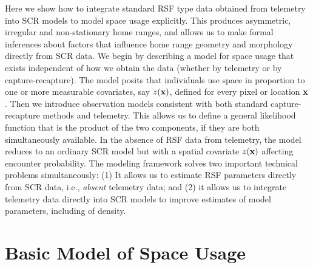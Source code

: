 Here we show how to integrate standard RSF type data obtained from
telemetry into SCR models to model space usage explicitly.  This
produces asymmetric, irregular and non-stationary home ranges, and
allows us to make formal inferences about factors that influence home
range geometry and morphology directly from SCR data.  We begin by
describing a model for space usage that exists independent of how we
obtain the data (whether by telemetry or by capture-recapture). The
model posits that individuals use space in proportion to one or more
measurable covariates, say $z({\bf x})$, defined for every pixel or
location ${\bf x}$.  Then we introduce observation models consistent
with both standard capture-recapture methods and telemetry.  This
allows us to define a general likelihood function that is the product
of the two components, if they are both simultaneously available.  In
the absence of RSF data from telemetry, the model reduces to an
ordinary SCR model but with a spatial covariate $z({\bf x})$ affecting
encounter probability.  The modeling framework solves two important
technical problems simultaneously: (1) It allows us to estimate RSF
parameters directly from SCR data, i.e., {\it absent} telemetry data;
and (2) it allows us to integrate telemetry data directly into SCR
models to improve estimates of model parameters, including of density.

\section{Basic Model of Space Usage}
\label{rsf.sec.rsfmodel}

